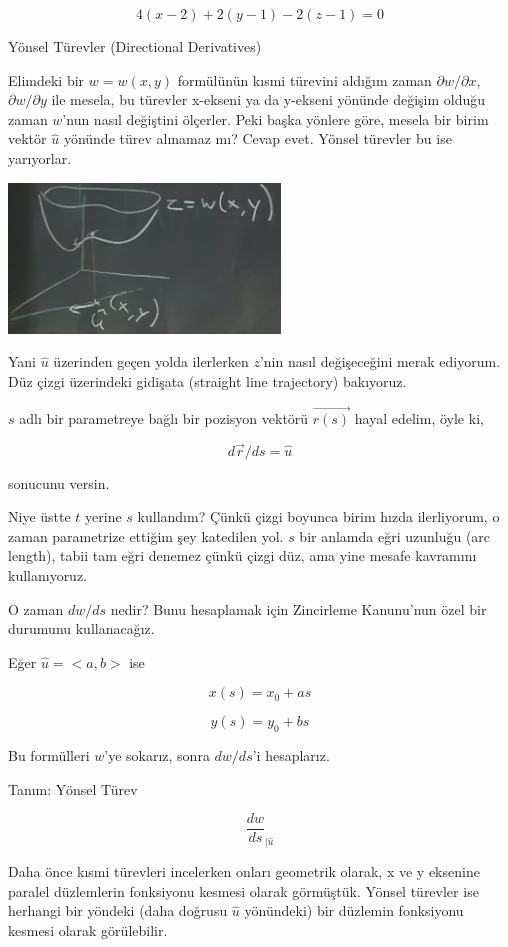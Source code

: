 \documentclass[12pt,fleqn]{article}\usepackage{../../common}
\begin{document}
$$ 4(x-2) + 2(y-1) - 2(z-1) = 0 $$

Yönsel Türevler (Directional Derivatives) 

Elimdeki bir $w = w(x,y)$ formülünün kısmi türevini aldığım zaman $\partial
w/\partial x$, $\partial w/\partial y$ ile mesela, bu türevler x-ekseni ya da
y-ekseni yönünde değişim olduğu zaman $w$'nun nasıl değiştini ölçerler. Peki
başka yönlere göre, mesela bir birim vektör $\hat{u}$ yönünde türev alınamaz mı?
Cevap evet. Yönsel türevler bu ise yarıyorlar.

\includegraphics[height=4cm]{12_6.png}

Yani $\hat{u}$ üzerinden geçen yolda ilerlerken $z$'nin nasıl değişeceğini merak
ediyorum. Düz çizgi üzerindeki gidişata (straight line trajectory) bakıyoruz.

$s$ adlı bir parametreye bağlı bir pozisyon vektörü $\vec{r(s)}$ hayal
edelim, öyle ki,

$$ d\vec{r}/ds = \hat{u} $$

sonucunu versin.

Niye üstte $t$ yerine $s$ kullandım? Çünkü çizgi boyunca birim hızda
ilerliyorum, o zaman parametrize ettiğim şey katedilen yol. $s$ bir anlamda eğri
uzunluğu (arc length), tabii tam eğri denemez çünkü çizgi düz, ama yine mesafe
kavramını kullanıyoruz.

O zaman $dw/ds$ nedir? Bunu hesaplamak için Zincirleme Kanunu'nun özel bir
durumunu kullanacağız.

Eğer $\hat{u} = <a,b>$ ise

$$ x(s) = x_0 + as $$

$$ y(s) = y_0 + bs $$

Bu formülleri $w$'ye sokarız, sonra $dw/ds$'i hesaplarız. 

Tanım: Yönsel Türev

$$ \frac{dw}{ds}_{|\hat{u}} $$

Daha önce kısmi türevleri incelerken onları geometrik olarak, x ve y
eksenine paralel düzlemlerin fonksiyonu kesmesi olarak görmüştük. Yönsel
türevler ise herhangi bir yöndeki (daha doğrusu $\hat{u}$ yönündeki) bir
düzlemin fonksiyonu kesmesi olarak görülebilir.
\end{document}
